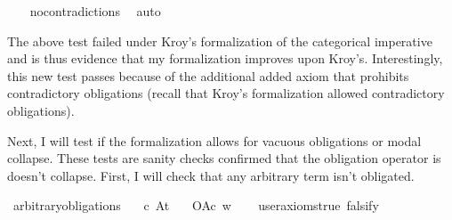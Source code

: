 \begin{isabellebody}
%
\isadelimproof
\ \ %
\endisadelimproof
%
\isatagproof
{}\isamarkupfalse%
\ no{\isacharunderscore}contradictions\ \isamarkupfalse%
\ auto\isanewline
%
%
\endisatagproof
{\isafoldproof}%
%
\isadelimproof
%
\endisadelimproof
%
\begin{isamarkuptext}%
The above test failed under Kroy's formalization of the categorical imperative and is thus evidence 
that my formalization improves upon Kroy's. Interestingly, this new test passes because of the additional
added axiom that prohibits contradictory obligations (recall that Kroy's formalization allowed contradictory
obligations).%
\end{isamarkuptext}\isamarkuptrue%
%
\begin{isamarkuptext}%
Next, I will test if the formalization allows for vacuous obligations or modal collapse. These 
tests are sanity checks confirmed that the obligation operator is doesn't collapse. First, I will check 
that any arbitrary term isn't obligated.%
\end{isamarkuptext}\isamarkuptrue%
\isamarkupfalse%
\ arbitrary{\isacharunderscore}obligations{\isacharcolon}\isanewline
\ \ \ c\ A{\isacharcolon}{\isacharcolon}{\isachardoublequoteopen}t{\isachardoublequoteclose}\isanewline
\ \ \ {\isachardoublequoteopen}O{\isacharbraceleft}A{\isacharbar}c{\isacharbraceright}\ w{\isachardoublequoteclose}\isanewline
\ \ \isamarkupfalse%
\ {\isacharbrackleft}user{\isacharunderscore}axioms{\isacharequal}true{\isacharcomma}\ falsify{\isacharbrackright}%
\isadelimproof
\ %
\endisadelimproof
%
\isatagproof
{}\isamarkupfalse%
\isanewline
%
\end{isabellebody}
